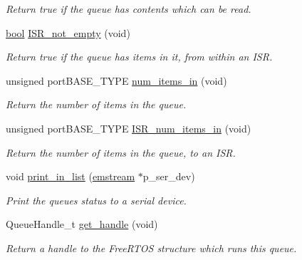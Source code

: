 \begin{DoxyCompactItemize}
\begin{DoxyCompactList}\small\item\em Return true if the queue has contents which can be read. \end{DoxyCompactList}\item 
\mbox{\hyperlink{group___motor___boolean___type_ga0ecf26b576b9a54eca656b9be7ba6a06}{bool}} \mbox{\hyperlink{class_task_queue_a805c30a60f68150f538577aaaab39e74}{I\+S\+R\+\_\+not\+\_\+empty}} (void)
\begin{DoxyCompactList}\small\item\em Return true if the queue has items in it, from within an I\+SR. \end{DoxyCompactList}\item 
unsigned port\+B\+A\+S\+E\+\_\+\+T\+Y\+PE \mbox{\hyperlink{class_task_queue_af6084d7ce87cefdfb3891dee4b3dfcfe}{num\+\_\+items\+\_\+in}} (void)
\begin{DoxyCompactList}\small\item\em Return the number of items in the queue. \end{DoxyCompactList}\item 
unsigned port\+B\+A\+S\+E\+\_\+\+T\+Y\+PE \mbox{\hyperlink{class_task_queue_af3589846ebd5b842b0b74ffa7e1029af}{I\+S\+R\+\_\+num\+\_\+items\+\_\+in}} (void)
\begin{DoxyCompactList}\small\item\em Return the number of items in the queue, to an I\+SR. \end{DoxyCompactList}\item 
void \mbox{\hyperlink{class_task_queue_ad5ccb9c99ca4f43304d408d915314d71}{print\+\_\+in\+\_\+list}} (\mbox{\hyperlink{classemstream}{emstream}} $\ast$p\+\_\+ser\+\_\+dev)
\begin{DoxyCompactList}\small\item\em Print the queue\textquotesingle{}s status to a serial device. \end{DoxyCompactList}\item 
Queue\+Handle\+\_\+t \mbox{\hyperlink{class_task_queue_a76d88ebf1c89534addd90863cb0a1015}{get\+\_\+handle}} (void)
\begin{DoxyCompactList}\small\item\em Return a handle to the Free\+R\+T\+OS structure which runs this queue. \end{DoxyCompactList}\end{DoxyCompactItemize}
